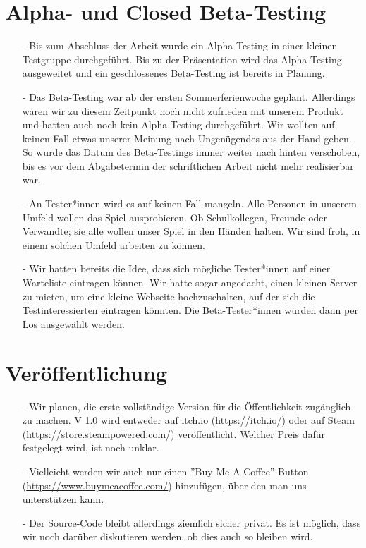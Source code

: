 \section{Alpha- und Closed Beta-Testing}
\begin{itemize}
    \item[-] Bis zum Abschluss der Arbeit wurde ein Alpha-Testing in einer kleinen Testgruppe durchgeführt. Bis zu der Präsentation wird
    das Alpha-Testing ausgeweitet und ein geschlossenes Beta-Testing ist bereits in Planung. 
    \item[-] Das Beta-Testing war ab der ersten Sommerferienwoche geplant. Allerdings waren wir zu diesem Zeitpunkt noch nicht zufrieden mit unserem Produkt und hatten auch noch kein Alpha-Testing durchgeführt. Wir wollten
    auf keinen Fall etwas unserer Meinung nach Ungenügendes aus der Hand geben. So wurde das Datum des Beta-Testings immer weiter nach hinten verschoben, bis es vor dem Abgabetermin der schriftlichen Arbeit nicht mehr realisierbar war.
    \item[-] An Tester*innen wird es auf keinen Fall mangeln. Alle Personen in unserem Umfeld wollen
    das Spiel ausprobieren. Ob Schulkollegen, Freunde oder Verwandte; sie alle wollen unser Spiel in den Händen halten. Wir sind froh, in einem solchen Umfeld arbeiten zu können.
    \item[-] Wir hatten bereits die Idee, dass sich mögliche Tester*innen auf einer Warteliste eintragen können. Wir hatte sogar angedacht, einen kleinen Server zu mieten,
    um eine kleine Webseite hochzuschalten, auf der sich die Testinteressierten eintragen könnten. Die Beta-Tester*innen würden dann per Los ausgewählt werden.
\end{itemize}

\section{Veröffentlichung}
\begin{itemize}
    \item[-] Wir planen, die erste vollständige Version für die Öffentlichkeit zugänglich zu machen. V 1.0 wird entweder auf itch.io (\url{https://itch.io/}) oder auf \gls{Steam} 
    (\url{https://store.steampowered.com/}) veröffentlicht. Welcher Preis dafür festgelegt wird, ist noch unklar.
    \item[-] Vielleicht werden wir auch nur einen ''Buy Me A Coffee''-Button (\url{https://www.buymeacoffee.com/}) hinzufügen, über den man uns unterstützen kann. 
    \item[-] Der Source-Code bleibt allerdings ziemlich sicher privat. Es ist möglich, dass wir noch darüber diskutieren werden, ob dies auch so bleiben wird.
\end{itemize}



